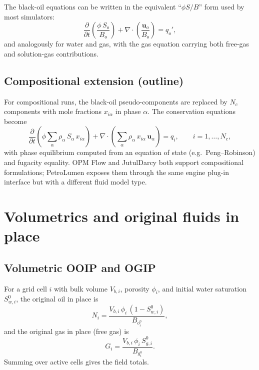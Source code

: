 \documentclass[10pt,a4paper]{article}
\newcommand{\pd}[2]{\frac{\partial #1}{\partial #2}}
\newcommand{\divv}{\nabla\cdot}
\newcommand{\bo}{B_o}
\newcommand{\bg}{B_g}
\begin{document}
The black-oil equations can be written in the equivalent ``$\phi S/B$'' form
used by most simulators:
\begin{equation}
  \pd{}{t}\!\left(\frac{\phi\,S_o}{\bo}\right)
  + \divv\!\left(\frac{\bm{u}_o}{\bo}\right)
  = q_o',
  \label{eq:bo-form}
\end{equation}
and analogously for water and gas, with the gas equation carrying both free-gas
and solution-gas contributions.

\subsection{Compositional extension (outline)}

For compositional runs, the black-oil pseudo-components are replaced by $N_c$
components with mole fractions $x_{i\alpha}$ in phase $\alpha$. The
conservation equations become
\begin{equation}
  \pd{}{t}\!\left(\phi\sum_{\alpha}\rho_\alpha\,S_\alpha\,x_{i\alpha}\right)
  + \divv\!\left(\sum_{\alpha}\rho_\alpha\,x_{i\alpha}\,\bm{u}_\alpha\right)
  = q_i,
  \qquad i=1,\dots,N_c,
  \label{eq:comp-cons}
\end{equation}
with phase equilibrium computed from an equation of state (e.g.\ Peng--Robinson)
and fugacity equality. OPM Flow and JutulDarcy both support compositional
formulations; PetroLumen exposes them through the same engine plug-in
interface but with a different fluid model type.

\section{Volumetrics and original fluids in place}

\subsection{Volumetric OOIP and OGIP}

For a grid cell $i$ with bulk volume $V_{b,i}$, porosity $\phi_i$, and initial
water saturation $S_{w,i}^0$, the original oil in place is
\begin{equation}
  N_i = \frac{V_{b,i}\,\phi_i\,(1-S_{w,i}^0)}{\bo_i^0},
  \label{eq:ooip-cell}
\end{equation}
and the original gas in place (free gas) is
\begin{equation}
  G_i = \frac{V_{b,i}\,\phi_i\,S_{g,i}^0}{\bg_i^0}.
  \label{eq:ogip-cell}
\end{equation}
Summing over active cells gives the field totals.
\end{document}
